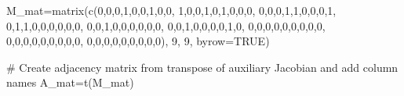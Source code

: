\documentclass[
  letterpaper,
  DIV=11,
  numbers=noendperiod]{scrreprt}
\newenvironment{Shaded}{\begin{snugshade}}{\end{snugshade}}
\newcommand{\AttributeTok}[1]{\textcolor[rgb]{0.40,0.45,0.13}{#1}}
\newcommand{\CommentTok}[1]{\textcolor[rgb]{0.37,0.37,0.37}{#1}}
\newcommand{\ConstantTok}[1]{\textcolor[rgb]{0.56,0.35,0.01}{#1}}
\newcommand{\DecValTok}[1]{\textcolor[rgb]{0.68,0.00,0.00}{#1}}
\newcommand{\FunctionTok}[1]{\textcolor[rgb]{0.28,0.35,0.67}{#1}}
\newcommand{\NormalTok}[1]{\textcolor[rgb]{0.00,0.23,0.31}{#1}}
\newcommand{\OtherTok}[1]{\textcolor[rgb]{0.00,0.23,0.31}{#1}}
\begin{document}
\begin{Shaded}
\begin{Highlighting}[]
\NormalTok{M\_mat}\OtherTok{=}\FunctionTok{matrix}\NormalTok{(}\FunctionTok{c}\NormalTok{(}\DecValTok{0}\NormalTok{,}\DecValTok{0}\NormalTok{,}\DecValTok{0}\NormalTok{,}\DecValTok{1}\NormalTok{,}\DecValTok{0}\NormalTok{,}\DecValTok{0}\NormalTok{,}\DecValTok{1}\NormalTok{,}\DecValTok{0}\NormalTok{,}\DecValTok{0}\NormalTok{,}
               \DecValTok{1}\NormalTok{,}\DecValTok{0}\NormalTok{,}\DecValTok{0}\NormalTok{,}\DecValTok{1}\NormalTok{,}\DecValTok{0}\NormalTok{,}\DecValTok{1}\NormalTok{,}\DecValTok{0}\NormalTok{,}\DecValTok{0}\NormalTok{,}\DecValTok{0}\NormalTok{,}
               \DecValTok{0}\NormalTok{,}\DecValTok{0}\NormalTok{,}\DecValTok{0}\NormalTok{,}\DecValTok{1}\NormalTok{,}\DecValTok{1}\NormalTok{,}\DecValTok{0}\NormalTok{,}\DecValTok{0}\NormalTok{,}\DecValTok{0}\NormalTok{,}\DecValTok{1}\NormalTok{,}
               \DecValTok{0}\NormalTok{,}\DecValTok{1}\NormalTok{,}\DecValTok{1}\NormalTok{,}\DecValTok{0}\NormalTok{,}\DecValTok{0}\NormalTok{,}\DecValTok{0}\NormalTok{,}\DecValTok{0}\NormalTok{,}\DecValTok{0}\NormalTok{,}\DecValTok{0}\NormalTok{,}
               \DecValTok{0}\NormalTok{,}\DecValTok{0}\NormalTok{,}\DecValTok{1}\NormalTok{,}\DecValTok{0}\NormalTok{,}\DecValTok{0}\NormalTok{,}\DecValTok{0}\NormalTok{,}\DecValTok{0}\NormalTok{,}\DecValTok{0}\NormalTok{,}\DecValTok{0}\NormalTok{,}
               \DecValTok{0}\NormalTok{,}\DecValTok{0}\NormalTok{,}\DecValTok{1}\NormalTok{,}\DecValTok{0}\NormalTok{,}\DecValTok{0}\NormalTok{,}\DecValTok{0}\NormalTok{,}\DecValTok{0}\NormalTok{,}\DecValTok{1}\NormalTok{,}\DecValTok{0}\NormalTok{,}
               \DecValTok{0}\NormalTok{,}\DecValTok{0}\NormalTok{,}\DecValTok{0}\NormalTok{,}\DecValTok{0}\NormalTok{,}\DecValTok{0}\NormalTok{,}\DecValTok{0}\NormalTok{,}\DecValTok{0}\NormalTok{,}\DecValTok{0}\NormalTok{,}\DecValTok{0}\NormalTok{,}
               \DecValTok{0}\NormalTok{,}\DecValTok{0}\NormalTok{,}\DecValTok{0}\NormalTok{,}\DecValTok{0}\NormalTok{,}\DecValTok{0}\NormalTok{,}\DecValTok{0}\NormalTok{,}\DecValTok{0}\NormalTok{,}\DecValTok{0}\NormalTok{,}\DecValTok{0}\NormalTok{,}
               \DecValTok{0}\NormalTok{,}\DecValTok{0}\NormalTok{,}\DecValTok{0}\NormalTok{,}\DecValTok{0}\NormalTok{,}\DecValTok{0}\NormalTok{,}\DecValTok{0}\NormalTok{,}\DecValTok{0}\NormalTok{,}\DecValTok{0}\NormalTok{,}\DecValTok{0}\NormalTok{), }\DecValTok{9}\NormalTok{, }\DecValTok{9}\NormalTok{, }\AttributeTok{byrow=}\ConstantTok{TRUE}\NormalTok{)}

\CommentTok{\# Create adjacency matrix from transpose of auxiliary Jacobian and add column names}
\NormalTok{A\_mat}\OtherTok{=}\FunctionTok{t}\NormalTok{(M\_mat)}


\end{Highlighting}
\end{Shaded}
\end{document}
